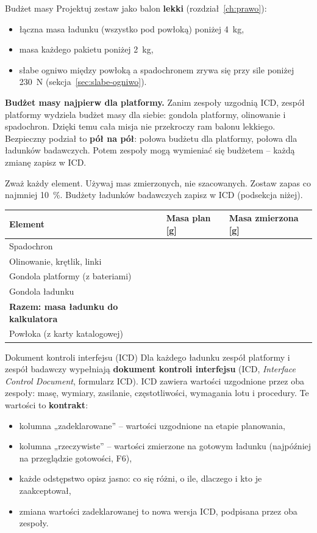 \begin{podsekcja}{Budżet masy}\label{sec:budzet}
Projektuj zestaw jako balon \textbf{lekki} (rozdział~\ref{ch:prawo}):
\begin{itemize}
  \item łączna masa ładunku (wszystko pod powłoką) poniżej \SI{4}{kg},
  \item masa każdego pakietu poniżej \SI{2}{kg},
  \item słabe ogniwo między powłoką a spadochronem zrywa się przy sile poniżej \SI{230}{N} (sekcja~\ref{sec:slabe-ogniwo}).
\end{itemize}

\textbf{Budżet masy najpierw dla platformy.} Zanim zespoły uzgodnią ICD, zespół platformy wydziela budżet masy dla siebie: gondola platformy, olinowanie i spadochron. Dzięki temu cała misja nie przekroczy ram balonu lekkiego. Bezpieczny podział to \textbf{pół na pół}: połowa budżetu dla platformy, połowa dla ładunków badawczych. Potem zespoły mogą wymieniać się budżetem -- każdą zmianę zapisz w ICD.

Zważ każdy element. Używaj mas zmierzonych, nie szacowanych. Zostaw zapas co najmniej \SI{10}{\percent}. Budżety ładunków badawczych zapisz w ICD (podsekcja niżej).

\renewcommand{\arraystretch}{1.6}
\begin{tabularx}{\linewidth}{@{}|L|P{25mm}|P{25mm}|@{}}\hline
\textbf{Element} & \textbf{Masa plan [g]} & \textbf{Masa zmierzona [g]}\\\hline
Spadochron & & \\\hline
Olinowanie, krętlik, linki & & \\\hline
Gondola platformy (z bateriami) & & \\\hline
Gondola ładunku & & \\\hline
\textbf{Razem: masa ładunku do kalkulatora} & & \\\hline
Powłoka (z karty katalogowej) & & \\\hline
\end{tabularx}
\end{podsekcja}

\begin{podsekcja}{Dokument kontroli interfejsu (ICD)}\label{sec:icd}
Dla każdego ładunku zespół platformy i zespół badawczy wypełniają \textbf{dokument kontroli interfejsu} (ICD, \emph{Interface Control Document}, formularz ICD). ICD zawiera wartości uzgodnione przez oba zespoły: masę, wymiary, zasilanie, częstotliwości, wymagania lotu i procedury. Te wartości to \textbf{kontrakt}:
\begin{itemize}
  \item kolumna „zadeklarowane” -- wartości uzgodnione na etapie planowania,
  \item kolumna „rzeczywiste” -- wartości zmierzone na gotowym ładunku (najpóźniej na przeglądzie gotowości, F6),
  \item każde odstępstwo opisz jasno: co się różni, o ile, dlaczego i kto je zaakceptował,
  \item zmiana wartości zadeklarowanej to nowa wersja ICD, podpisana przez oba zespoły.
\end{itemize}
\end{podsekcja}

